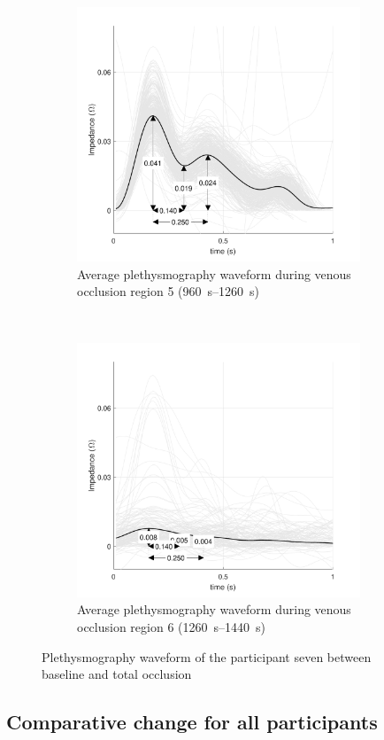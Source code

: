 \begin{figure}[t!]
	\centering
	\begin{subfigure}[t]{0.5\textwidth}
		\centering
		\includegraphics[height=7.6cm]{figure10a}
		\caption{Average plethysmography waveform during venous occlusion region 5 (\SIrange{960}{1260}{\second})}
		\label{fig:iPG_total_baseline}
	\end{subfigure}%
	~ 
	\begin{subfigure}[t]{0.5\textwidth}
		\centering
		\includegraphics[height=7.6cm]{figure10b}
		\caption{Average plethysmography waveform during venous occlusion region 6 (\SIrange{1260}{1440}{\second})}
		\label{fig:iPG_total_occlusion}
	\end{subfigure}
	\caption{Plethysmography waveform of the participant seven between baseline and total occlusion}
	\label{fig:iPG_total}
\end{figure}
\subsection{Comparative change for all participants}
\label{section5.3.4}

